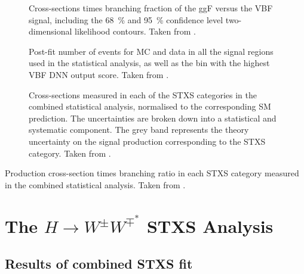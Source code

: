 \begin{figure}
    \caption{Cross-sections times branching fraction of the ggF versus the VBF signal, including the \SI{68}{\percent} and \SI{95}{\percent} confidence level two-dimensional likelihood contours. Taken from .}
    \label{fig:avocado-plot}
\end{figure}

\begin{figure}
    \caption{Post-fit number of events for MC and data in all the signal regions used in the statistical analysis, as well as the bin with the highest VBF DNN output score. Taken from .}
    \label{fig:post-fit-yields}
\end{figure}



\begin{figure}
    \caption{Cross-sections measured in each of the STXS categories in the combined statistical analysis, normalised to the corresponding SM prediction. The uncertainties are broken down into a statistical and systematic component. The grey band represents the theory uncertainty on the signal production corresponding to the STXS category. Taken from .}
    \label{fig:stxs-pois-bar-plot}
\end{figure}

\begin{table}
    \caption{Production cross-section times \HWW branching ratio in each STXS category measured in the combined statistical analysis. Taken from .}
    \label{tab:stxs-xsec-uncertainties}
\end{table}


\section{The $H\rightarrow W^{\pm}W^{\mp^*}$ STXS Analysis}
\subsection{Results of combined STXS fit}
